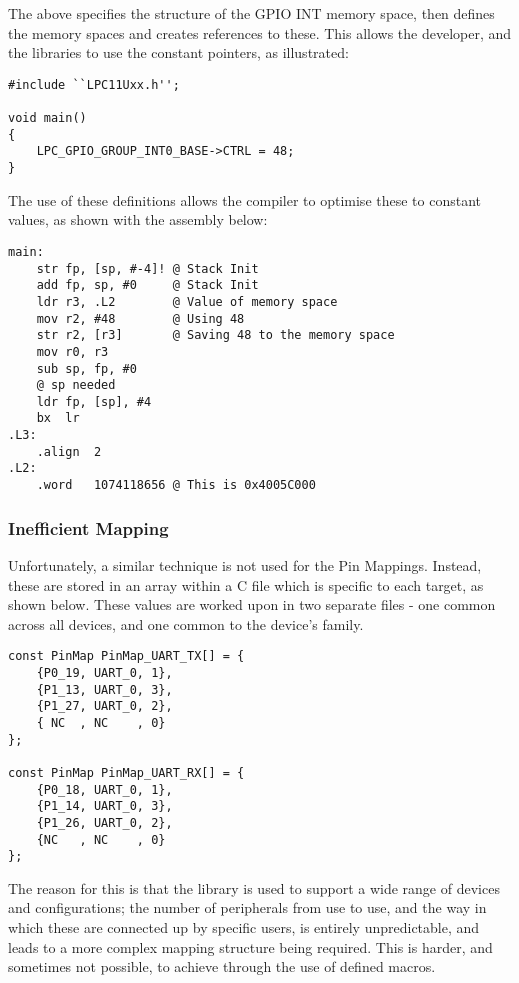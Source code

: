 The above specifies the structure of the GPIO INT memory space, then defines the memory spaces and creates references to these. This allows the developer, and the libraries to use the constant pointers, as illustrated:

\begin{lstlisting}[caption={LPC GPIO GROUP INT0 being used}]
#include ``LPC11Uxx.h'';

void main()
{
    LPC_GPIO_GROUP_INT0_BASE->CTRL = 48;
}
\end{lstlisting}

The use of these definitions allows the compiler to optimise these to constant values, as shown with the assembly below:

\begin{lstlisting}[caption={LPC GPIO GROUP INT0 converted to ASM}]
main:
    str fp, [sp, #-4]! @ Stack Init
    add fp, sp, #0     @ Stack Init
    ldr r3, .L2        @ Value of memory space
    mov r2, #48        @ Using 48
    str r2, [r3]       @ Saving 48 to the memory space
    mov r0, r3
    sub sp, fp, #0
    @ sp needed
    ldr fp, [sp], #4
    bx  lr
.L3:
    .align  2
.L2:
    .word   1074118656 @ This is 0x4005C000
\end{lstlisting}

\subsubsection{Inefficient Mapping}

Unfortunately, a similar technique is not used for the Pin Mappings. Instead, these are stored in an array within a C file which is specific to each target, as shown below. These values are worked upon in two separate files - one common across all devices, and one common to the device's family.

\begin{lstlisting}[caption={PinMap Arrays}]
const PinMap PinMap_UART_TX[] = {
    {P0_19, UART_0, 1},
    {P1_13, UART_0, 3},
    {P1_27, UART_0, 2},
    { NC  , NC    , 0}
};

const PinMap PinMap_UART_RX[] = {
    {P0_18, UART_0, 1},
    {P1_14, UART_0, 3},
    {P1_26, UART_0, 2},
    {NC   , NC    , 0}
};
\end{lstlisting}

The reason for this is that the library is used to support a wide range of devices and configurations; the number of peripherals from use to use, and the way in which these are connected up by specific users, is entirely unpredictable, and leads to a more complex mapping structure being required. This is harder, and sometimes not possible, to achieve through the use of defined macros.

